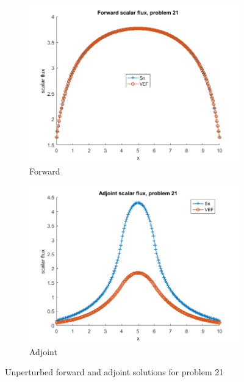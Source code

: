 \documentclass{article}
\begin{document}
\begin{figure}[H]
\centering
\begin{subfigure}{.5\textwidth}
  \centering
  \includegraphics[width=1\linewidth]{p21f.png}
  \caption{Forward}
  \label{fig:sub1}
\end{subfigure}%
\begin{subfigure}{.5\textwidth}
  \centering
  \includegraphics[width=1\linewidth]{p21a.png}
  \caption{Adjoint}
  \label{fig:sub2}
\end{subfigure}
\caption{Unperturbed forward and adjoint solutions for problem 21}
\label{fig:test}
\end{figure}
\end{document}
